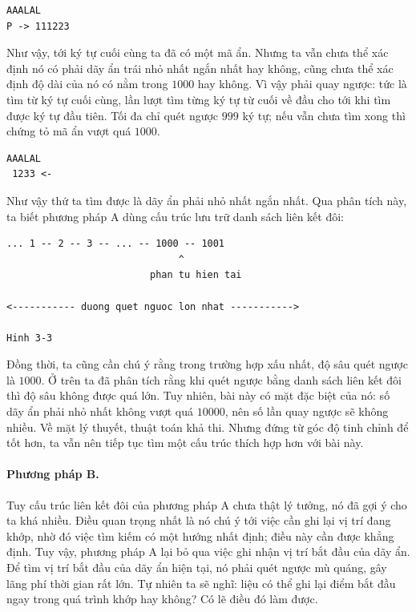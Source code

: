 \documentclass[11pt]{article}
\begin{document}
\begin{verbatim}
AAALAL
P -> 111223
\end{verbatim}

Như vậy, tới ký tự cuối cùng ta đã có một mã ẩn. Nhưng ta vẫn chưa thể xác
định nó có phải dãy ẩn trái nhỏ nhất ngắn nhất hay không, cũng chưa thể xác
định độ dài của nó có nằm trong \(1000\) hay không. Vì vậy phải quay ngược:
tức là tìm từ ký tự cuối cùng, lần lượt tìm từng ký tự từ cuối về đầu cho tới
khi tìm được ký tự đầu tiên. Tối đa chỉ quét ngược \(999\) ký tự; nếu vẫn
chưa tìm xong thì chứng tỏ mã ẩn vượt quá \(1000\).

\begin{verbatim}
AAALAL
 1233 <-
\end{verbatim}

Như vậy thứ ta tìm được là dãy ẩn phải nhỏ nhất ngắn nhất. Qua phân tích này,
ta biết phương pháp A dùng cấu trúc lưu trữ danh sách liên kết đôi:

\begin{verbatim}
... 1 -- 2 -- 3 -- ... -- 1000 -- 1001
                              ^
                         phan tu hien tai

<----------- duong quet nguoc lon nhat ----------->

Hinh 3-3
\end{verbatim}

Đồng thời, ta cũng cần chú ý rằng trong trường hợp xấu nhất, độ sâu quét
ngược là \(1000\). Ở trên ta đã phân tích rằng khi quét ngược bằng danh sách
liên kết đôi thì độ sâu không được quá lớn. Tuy nhiên, bài này có mặt đặc
biệt của nó: số dãy ẩn phải nhỏ nhất không vượt quá \(10000\), nên số lần
quay ngược sẽ không nhiều. Về mặt lý thuyết, thuật toán khả thi. Nhưng đứng
từ góc độ tinh chỉnh để tốt hơn, ta vẫn nên tiếp tục tìm một cấu trúc thích
hợp hơn với bài này.

\paragraph{Phương pháp B.}
Tuy cấu trúc liên kết đôi của phương pháp A chưa thật lý tưởng, nó đã gợi ý
cho ta khá nhiều. Điều quan trọng nhất là nó chú ý tới việc cần ghi lại vị
trí đang khớp, nhờ đó việc tìm kiếm có một hướng nhất định; điều này cần được
khẳng định. Tuy vậy, phương pháp A lại bỏ qua việc ghi nhận vị trí bắt đầu
của dãy ẩn. Để tìm vị trí bắt đầu của dãy ẩn hiện tại, nó phải quét ngược mù
quáng, gây lãng phí thời gian rất lớn. Tự nhiên ta sẽ nghĩ: liệu có thể ghi
lại điểm bắt đầu ngay trong quá trình khớp hay không? Có lẽ điều đó làm được.
\end{document}
